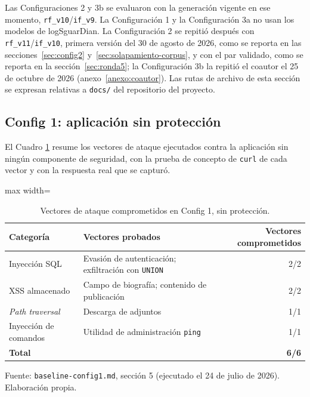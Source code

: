 Las Configuraciones 2 y 3b se evaluaron con la generación vigente en ese momento, \texttt{rf\_v10}/\texttt{if\_v9}. La Configuración 1 y la Configuración 3a no usan los modelos de logSguarDian. La Configuración 2 se repitió después con \texttt{rf\_v11}/\texttt{if\_v10}, primera versión del 30 de agosto de 2026, como se reporta en las secciones~\ref{sec:config2} y~\ref{sec:solapamiento-corpus}, y con el par validado, como se reporta en la sección~\ref{sec:ronda5}; la Configuración 3b la repitió el coautor el 25 de octubre de 2026 (anexo~\ref{anexo:coautor}). Las rutas de archivo de esta sección se expresan relativas a \texttt{docs/} del repositorio del proyecto.

\subsection{Config 1: aplicación sin protección}

El Cuadro \ref{tabla:res-config1} resume los vectores de ataque ejecutados contra la aplicación sin ningún componente de seguridad, con la prueba de concepto de \texttt{curl} de cada vector y con la respuesta real que se capturó.

\begin{table}[htbp]
\centering
\footnotesize
\setlength{\tabcolsep}{3pt}
\begin{adjustbox}{max width=\linewidth}
\begin{tabular}{|l|l|r|}
\hline
\textbf{Categoría} & \textbf{Vectores probados} & \textbf{Vectores comprometidos} \\ \hline
Inyección SQL & Evasión de autenticación; exfiltración con \texttt{UNION} & 2/2 \\ \hline
XSS almacenado & Campo de biografía; contenido de publicación & 2/2 \\ \hline
\textit{Path traversal} & Descarga de adjuntos & 1/1 \\ \hline
Inyección de comandos & Utilidad de administración \texttt{ping} & 1/1 \\ \hline
\textbf{Total} & & \textbf{6/6} \\ \hline
\end{tabular}
\end{adjustbox}
\caption{Vectores de ataque comprometidos en Config 1, sin protección.}
\label{tabla:res-config1}
\par\smallskip\footnotesize Fuente: \texttt{baseline-config1.md}, sección 5 (ejecutado el 24 de julio de 2026). Elaboración propia.
\end{table}


